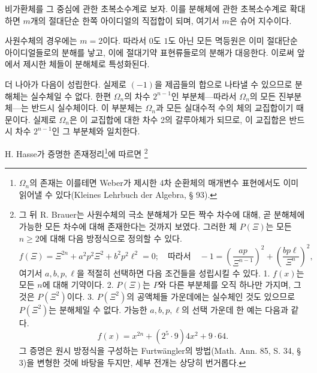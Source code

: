 비가환체를 그 중심에 관한 초복소수계로 보자. 이를 분해체에 관한 초복소수계로 확대하면 $m$개의 절대단순 한쪽 아이디얼의 직접합이 되며, 여기서 $m$은 슈어 지수이다.

사원수체의 경우에는 $m=2$이다. 따라서 $0$도 $1$도 아닌 모든 멱등원은 이미 절대단순 아이디얼들로의 분해를 낳고, 이에 절대기약 표현류들로의 분해가 대응한다. 이로써 앞에서 제시한 체들이 분해체로 특성화된다.

더 나아가 다음이 성립한다.  실제로 $(-1)$을 제곱들의 합으로 나타낼 수 있으므로 분해체는 실수체일 수 없다. 한편 $\Omega_n$의 차수 $2^{n-1}$인 부분체---따라서 $\Omega_n$의 모든 진부분체---는 반드시 실수체이다. 이 부분체는 $\Omega_n$과 모든 실대수적 수의 체의 교집합이기 때문이다. 실제로 $\Omega_n$은 이 교집합에 대한 차수 2의 갈루아체가 되므로, 이 교집합은 반드시 차수 $2^{n-1}$인 그 부분체와 일치한다.

H. Hasse가 증명한 존재정리\footnote{$\Omega_n$의 존재는 이를테면 Weber가 제시한 4차 순환체의 매개변수 표현에서도 이미 읽어낼 수 있다(Kleines Lehrbuch der Algebra, § 93).}에 따르면 \footnote{그 뒤 R. Brauer는 사원수체의 극소 분해체가 모든 짝수 차수에 대해, 곧 분해체에 가능한 모든 차수에 대해 존재한다는 것까지 보였다. 그러한 체 $P(\Xi)$는 모든 $n\ge2$에 대해 다음 방정식으로 정의할 수 있다.
\[
 f(\Xi)=\Xi^{2n}+a^2p^2\Xi^2+b^2p^2\ell^2=0;
\quad \text{따라서}\quad -1=\left(\frac{ap}{\Xi^{n-1}}\right)^2+
        \left(\frac{bp\ell}{\Xi^n}\right)^2,
\]
여기서 $a,b,p,\ell$을 적절히 선택하면 다음 조건들을 성립시킬 수 있다. 1. $f(x)$는 모든 $n$에 대해 기약이다. 2. $P(\Xi)$는 $P$와 다른 부분체를 오직 하나만 가지며, 그것은 $P(\Xi^2)$이다. 3. $P(\Xi^2)$의 공액체들 가운데에는 실수체인 것도 있으므로 $P(\Xi^2)$는 분해체일 수 없다. 가능한 $a,b,p,\ell$의 선택 가운데 한 예는 다음과 같다.
\[
        f(x)=x^{2n}+(2^5\cdot9)4x^2+9\cdot64.
\]
그 증명은 원시 방정식을 구성하는 Furtwängler의 방법(Math. Ann. 85, S. 34, § 3)을 변형한 것에 바탕을 두지만, 세부 전개는 상당히 번거롭다.}

